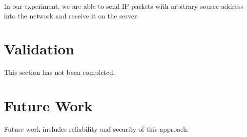 In our experiment, we are able to send IP packets with arbitrary source address into
the network and receive it on the server.

\section{Validation}
This section has not been completed.

\section{Future Work}
Future work includes reliability and security of this approach.




